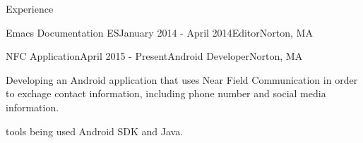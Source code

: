\documentclass{resume} %
\begin{document}
\begin{rSection}{Experience}
\begin{rSubsection}{Emacs Documentation ES}{January 2014 - April 2014}{Editor}{Norton, MA}
\end{rSubsection}


\begin{rSubsection}{NFC Application}{April 2015 - Present}{Android Developer}{Norton, MA}

\item Developing an Android application that uses Near Field Communication in order to exchage contact information, including phone number and social media information.

\item tools being used Android SDK and Java. 



\end{rSubsection}

\end{rSection}










\end{document}
